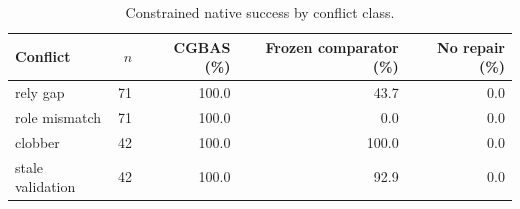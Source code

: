 \begin{table}[t]
\centering
\small
\caption{Constrained native success by conflict class.}
\begin{tabular}{lrrrr}
\toprule
Conflict & $n$ & CGBAS (\%) & Frozen comparator (\%) & No repair (\%) \\
\midrule
rely gap & 71 & 100.0 & 43.7 & 0.0 \\
role mismatch & 71 & 100.0 & 0.0 & 0.0 \\
clobber & 42 & 100.0 & 100.0 & 0.0 \\
stale validation & 42 & 100.0 & 92.9 & 0.0 \\
\bottomrule
\end{tabular}
\end{table}
